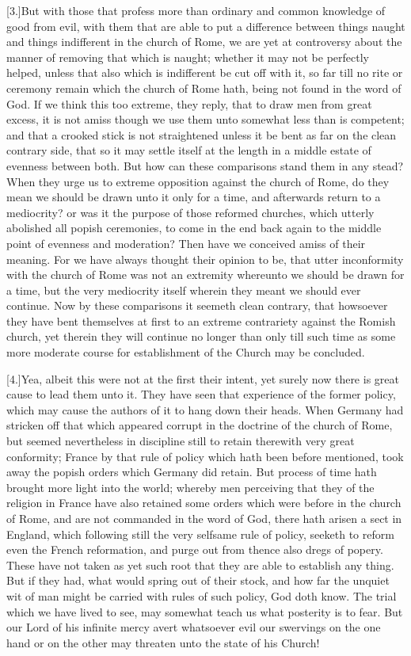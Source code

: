[3.]But with those that profess more than ordinary and common knowledge of good from evil, with them that are able to put a difference between things naught and things indifferent in the church of Rome, we are yet at controversy about the manner of removing that which is naught; whether it may not be perfectly helped, unless that also which is indifferent be cut off with it, so far till no rite or ceremony remain which the church of Rome hath, being not found in the word of God. If we think this too extreme, they reply, that to draw men from great excess, it is not amiss though we  use them unto somewhat less than is competent; and that a crooked stick is not straightened unless it be bent as far on the clean contrary side, that so it may settle itself at the length in a middle estate of evenness between both. But how can these comparisons stand them in any stead? When they urge us to extreme opposition against the church of Rome, do they mean we should be drawn unto it only for a time, and afterwards return to a mediocrity? or was it the purpose of those reformed churches, which utterly abolished all popish ceremonies, to come in the end back again to the middle point of evenness and moderation? Then have we conceived amiss of their meaning. For we have always thought their opinion to be, that utter inconformity with the church of Rome was not an extremity whereunto we should be drawn for a time, but the very mediocrity itself wherein they meant we should ever continue. Now by these comparisons it seemeth clean contrary, that howsoever they have bent themselves at first to an extreme contrariety against the Romish church, yet therein they will continue no longer than only till such time as some more moderate course for establishment of the Church may be concluded.

[4.]Yea, albeit this were not at the first their intent, yet surely now there is great cause to lead them unto it. They have seen that experience of the former policy, which may cause the authors of it to hang down their heads. When Germany had stricken off that which appeared corrupt in the doctrine of the church of Rome, but seemed nevertheless in discipline still to retain therewith very great conformity; France by that rule of policy which hath been before mentioned, took away the popish orders which Germany did retain. But process of time hath brought more light into the world; whereby men perceiving that they of the religion in France have also retained some orders which were before  in the church of Rome, and are not commanded in the word of God, there hath arisen a sect in England, which following still the very selfsame rule of policy, seeketh to reform even the French reformation, and purge out from thence also dregs of popery. These have not taken as yet such root that they are able to establish any thing. But if they had, what would spring out of their stock, and how far the unquiet wit of man might be carried with rules of such policy, God doth know. The trial which we have lived to see, may somewhat teach us what posterity is to fear. But our Lord of his infinite mercy avert whatsoever evil our swervings on the one hand or on the other may threaten unto the state of his Church!

